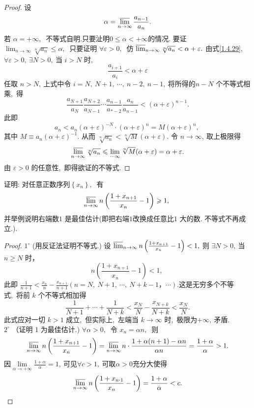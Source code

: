 \begin{proof}
	设
	\begin{equation}
		\alpha=\varlimsup_{n \rightarrow \infty} \frac{a_{n-1}}{a_{n}} .\label{1.4.29}
	\end{equation}
	若 $ \alpha=+\infty ,\ $ 不等式自明.只要沚明$  0 \leqslant \alpha<+\infty  $的情况. 要证 $ \lim _{n \rightarrow \infty} \sqrt[n]{a_{n}} \leqslant \alpha ,\ $ 只要证明  $\forall \varepsilon>0 ,\ $ 仿  $\varlimsup_{n \rightarrow \infty} \sqrt[n]{a_{n}}<\alpha+\varepsilon .$ 由式\eqref{1.4.29},\   $\forall \varepsilon>0,\  \exists N>0 ,\  $当  $i>N$  时,\ 
	$$\frac{a_{i+1}}{a_{i}}<\alpha+\varepsilon$$
	任取 $ n>N ,\  $上式中令  $i=N,\  N+1,\  \cdots,\  n-2,\  n-1 ,\  $将所得的$  n-N$  个不等式相乘,\  得		
	$$\frac{a_{N+1}}{a_{N}} \frac{a_{N+2}}{a_{N-1}} \cdots \frac{a_{n-1}}{a_{*-2}} \frac{a_{n}}{a_{n-1}}<(\alpha+\varepsilon)^{n-1} .$$		
	此即		
	$$a_{n}<a_{n}(\alpha+\varepsilon)^{-N} \cdot(\alpha+\varepsilon)^{n}=M(\alpha+\varepsilon)^{n},\ $$		
	其中  $M \equiv a_{n}(\alpha+\varepsilon)^{-1} .$ 从而  $\sqrt[n]{a_{n}}<\sqrt[n]{M}(\alpha+\varepsilon) .$ 令  $n \rightarrow \infty ,\  $取上极限得		
	$$\varlimsup_{n \rightarrow \infty} \sqrt[n]{a_{n}} \leqslant \lim _{\cdots \infty} \sqrt[n]{M}(\alpha+\varepsilon)=\alpha+\varepsilon .$$		
	由  $\varepsilon>0$  的任意性,\ 即得欲证的不等式.
\end{proof}
\newpage
\begin{problem}
	证明: 对任意正数序列$  \left\{x_{n}\right\} ,\ $ 有		
	$$\varlimsup_{n \rightarrow \infty} n\left(\frac{1+x_{n+1}}{x_{n}}-1\right) \geqslant 1 ,\ $$		
	并举例说明右端数$ 1$ 是最佳估计(即把右端$ 1 $改换成任意比$ 1$ 大的数. 不等式不再成 立.).
\end{problem}
\begin{proof}
	$1^{\circ} $ (用反证法证明不等式.) 设 $ \varlimsup_{n \rightarrow \infty} n\left(\frac{1+x_{n+1}}{x_{n}}-1\right)<1 ,\ $则 $ \exists N>0 ,\  $当  $n \geqslant   N $ 时，		
	$$n\left(\frac{1+x_{n+1}}{x_{n}}-1\right)<1,\ $$		
	此即  $\frac{1}{n+1}<\frac{x_{n}}{n}-\frac{x_{n+1}}{n+1}(n=N,\  N+1,\  \cdots,\  N+k-1 ， \cdots) .$这是无穷多个不等式,\  将前 $ k $ 个不等式相加得		
	$$\frac{1}{N+1}+\cdots+\frac{1}{N+k}<\frac{x_{N}}{N}-\frac{x_{N+k}}{N+k}<\frac{x_{N}}{N} .$$		
	此式应对一切 $ k>1 $ 成立,\  但实际上,\  左端当 $ k \rightarrow \infty $ 时,\  极限为$  +\infty ,\  $矛盾.\\
	$2^{\circ} $ （证明 1 为最佳估计.)  $\forall \alpha>0 ,\ $ 令  $x_{n}=\alpha n ,\ $ 则		
	$$\varlimsup_{n \rightarrow \infty} n\left(\frac{1+x_{n+1}}{x_{n}}-1\right)=\varlimsup_{n \rightarrow \infty} n \cdot \frac{1+\alpha(n+1)-\alpha n}{\alpha n}=\frac{1+\alpha}{\alpha}>1 .	$$	
	因$\lim\limits_{\alpha\rightarrow+\infty}\frac{1+\alpha}{\alpha}=1,\ $可见$\forall c>1,\ $可取$\alpha>0$充分大使得
	$$\varlimsup_{n \rightarrow \infty} n\left(\frac{1+x_{n \cdot 1}}{x_{n}}-1\right)=\frac{1+\alpha}{\alpha}<c.$$
\end{proof}